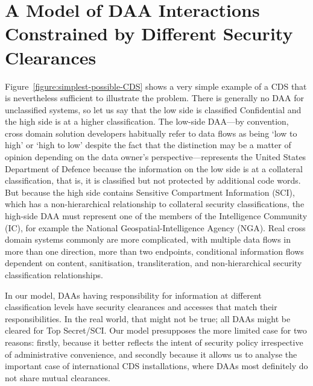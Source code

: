 \documentclass{llncs}
\begin{document}
\section{A Model of DAA Interactions Constrained by Different Security Clearances}

Figure~\ref{figure:simplest-possible-CDS} shows a very simple example of
a CDS that is nevertheless sufficient to illustrate the problem.
There is generally no DAA for unclassified systems, so let us say that the
low side is classified Confidential and the high side is at a higher classification.
The low-side DAA---by convention, cross domain solution developers habitually
refer to data flows as being `low to high' or `high to low' despite the
fact that the distinction may be a matter of opinion depending on the data
owner's
perspective---represents the United States Department of Defence because the information
on the low side is at a collateral classification, that is, it is classified but not
protected by additional code words.  But because the high side contains Sensitive
Compartment Information (SCI), which has a non-hierarchical relationship to
collateral security classifications, the high-side DAA must represent one of the members of the
Intelligence Community (IC), for example the National Geospatial-Intelligence
Agency (NGA).
Real cross domain systems commonly are more complicated, with multiple data flows in more than one
direction, more than two endpoints, conditional information flows dependent on content,
sanitisation, transliteration, and non-hierarchical security classification relationships.

In our model, DAAs having responsibility for information at different
classification levels have security clearances and accesses that match
their responsibilities.  In the real world, that might not be true; all
DAAs might be cleared for Top Secret/SCI.  Our model presupposes the more
limited case for two reasons: firstly, because it better reflects the
intent of security policy irrespective of administrative convenience, and
secondly because it allows us to analyse the important case of international
CDS installations, where DAAs most definitely do not share mutual clearances.
\end{document}
